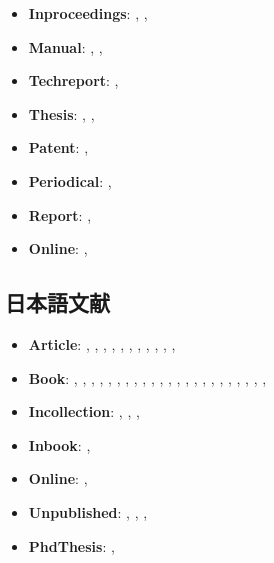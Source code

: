 \begin{itemize}
 \item \textbf{Inproceedings}:
       \textcite{wang89:_model},
       \textcite{zhang2016Deep},
 \item \textbf{Manual}:
       \textcite{brooke03:_gams},
       \textcite{cms},
 \item \textbf{Techreport}:
       \textcite{Peri2007},
 \item \textbf{Thesis}:
       \textcite{krugman77:_essay},
       \textcite{loh},
 \item \textbf{Patent}:
       \textcite{sorace},
 \item \textbf{Periodical}:
       \textcite{jcg},
 \item \textbf{Report}:
       \textcite{chiu},
 \item \textbf{Online}:
       \textcite{ctan},
\end{itemize}

\subsection{日本語文献}

\begin{itemize}
 \item \textbf{Article}:
       \textcite{iwamoto91jp:haito-keika},
       \textcite{Hattori00},
       \textcite{Hattori01},
       \textcite{Hattori02},
       \textcite{40018847518},
       \textcite{40017004376},
       \textcite{40020418914},
       \textcite{hosoda2017},
       \textcite{takeda2017300208},
       \textcite{120005614155},
       \textcite{120005678435},
 \item \textbf{Book}:
       \textcite{somusho04jp:2000io-kaisetsu},
       \textcite{imai71:_micr_1},
       \textcite{imai72:_micr_2},
       \textcite{ito85:_inte_trad},
       \textcite{kuroda97jp:keo},
       \textcite{miyazawa02:_io_intr},
       \textcite{katayama2001},
       \textcite{markusen99jp:trade_vol_1},
       \textcite{barro97jp},
       \textcite{nishimura90:_micr_econ},
       \textcite{arimura-takeda2012},
       \textcite{arimura2017jp},
       \textcite{a.___2000},
       \textcite{matloff__2012},
       \textcite{Boswell-2012},
       \textcite{Ryza2016},
       \textcite{ThoughtWorksinc.08},
       \textcite{chang-2013},
       \textcite{kuriyama20jp},
       \textcite{Mori-201206},
       \textcite{Uchida-90},
       \textcite{Yokomizo-2007},
       \textcite{Kuldell2018:_bio},
 \item \textbf{Incollection}:
       \textcite{oyama99:_mark_stru},
       \textcite{isikawa02jp:_env_trade},
       \textcite{takeda12:_cge},
 \item \textbf{Inbook}:
       \textcite{kiyono93:_regu_comp_1},
 \item \textbf{Online}:
       \textcite{takeda13:jecon},
 \item \textbf{Unpublished}:
       \textcite{naikakufu_2011},
       \textcite{takeda16jp:_gtap},
       \textcite{takeda07jp:cge},
 \item \textbf{PhdThesis}:
       \textcite{uzawa-phd-62},
\end{itemize}

